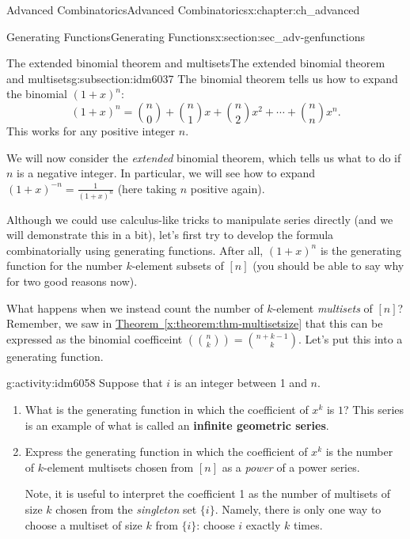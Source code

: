 \documentclass[oneside,10pt,]{book}
\newcommand{\terminology}[1]{\textbf{#1}}
\numberwithin{equation}{chapter}
\newcommand{\mchoose}[2]{\left(\!\binom{#1}{#2}\!\right)}
\begin{document}
\begin{chapterptx}{Advanced Combinatorics}{}{Advanced Combinatorics}{}{}{x:chapter:ch_advanced}
\begin{sectionptx}{Generating Functions}{}{Generating Functions}{}{}{x:section:sec_adv-genfunctions}
%
%
\typeout{************************************************}
\typeout{************************************************}
%
\begin{subsectionptx}{The extended binomial theorem and multisets}{}{The extended binomial theorem and multisets}{}{}{g:subsection:idm6037}
The binomial theorem tells us how to expand the binomial \((1+x)^n\):%
\begin{equation*}
(1+x)^n = \binom{n}{0} + \binom{n}{1}x + \binom{n}{2}x^2 + \cdots + \binom{n}{n}x^n\text{.}
\end{equation*}
This works for any positive integer \(n\).%
\par
We will now consider the \emph{extended} binomial theorem, which tells us what to do if \(n\) is a negative integer.  In particular, we will see how to expand \((1+x)^{-n} = \frac{1}{(1+x)^n}\) (here taking \(n\) positive again).%
\par
Although we could use calculus-like tricks to manipulate series directly (and we will demonstrate this in a bit), let's first try to develop the formula combinatorially using generating functions.  After all, \((1+x)^n\) is the generating function for the number \(k\)-element subsets of \([n]\) (you should be able to say why for two good reasons now).%
\par
What happens when we instead count the number of \(k\)-element \emph{multisets} of \([n]\)?  Remember, we saw in \hyperref[x:theorem:thm-multisetsize]{Theorem~\ref{x:theorem:thm-multisetsize}} that this can be expressed as the binomial coefficeint \(\mchoose{n}{k} = \binom{n+k-1}{k}\).  Let's put this into a generating function.%
\begin{activity}{}{g:activity:idm6058}%
Suppose that \(i\) is an integer between 1 and \(n\).%
\begin{enumerate}[font=\bfseries,label=(\alph*),ref=\alph*]
\item{}What is the generating function in which the coefficient of \(x^k\) is \(1\)? This series is an example of what is called an \terminology{infinite geometric series}.%
\item{}Express the generating function in which the coefficient of \(x^k\) is the number of \(k\)-element multisets chosen from \([n]\) as a \emph{power} of a power series.%
\par
Note, it is useful to interpret the coefficient 1 as the number of multisets of size \(k\) chosen from the \emph{singleton} set \(\{i\}\). Namely, there is only one way to choose a multiset of size \(k\) from \(\{i\}\): choose \(i\) exactly \(k\) times.%

\end{enumerate}
\end{activity}
\end{subsectionptx}
\end{sectionptx}
\end{chapterptx}
\end{document}

